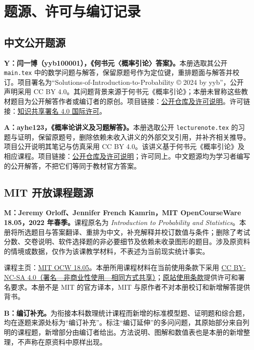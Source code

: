 \documentclass[UTF8,12pt,a4paper,fontset=fandol]{ctexart}
\begin{document}
\clearpage
\section*{题源、许可与编订记录}
\subsection*{中文公开题源}
\textbf{Y：闫一博（yyb100001），《何书元〈概率引论〉答案》。}本册选取其公开 \texttt{main.tex} 中的数学问题与解答，保留原题号作为定位键，重排题面与解答并校订。项目署名为“Solutions-of-Introduction-to-Probability © 2024 by yyb”，公开声明采用 CC BY 4.0。其问题背景来源于何书元《概率引论》；本册未冒称这些教材题目为公开解答作者或编订者的原创。项目链接：\href{https://github.com/yyb100001/Solutions-of-Introduction-to-Probability}{公开仓库及许可说明}。许可链接：\href{https://creativecommons.org/licenses/by/4.0/}{知识共享署名 4.0 国际许可}。

\textbf{A：ayhe123，《概率论讲义及习题解答》。}本册选取公开 \texttt{lecturenote.tex} 的习题与证明，保留原题号，删除依赖未收入讲义的外部交叉引用，并补齐相关推导。项目公开说明其笔记与仿真采用 CC BY 4.0。该讲义基于何书元《概率引论》及相应课程。项目链接：\href{https://github.com/ayhe123/probabilityTheory-lecturenote}{公开仓库及许可说明}；许可同上。中文题源均为学习者编写的公开解答，不把它们等同于教材官方答案。

\subsection*{MIT 开放课程题源}
\textbf{M：Jeremy Orloff、Jennifer French Kamrin，MIT OpenCourseWare 18.05，2022 年春季。}课程原名为 \textit{Introduction to Probability and Statistics}。本册将所选题目与答案翻译、重排为中文，补充解释并校订数值与条件；删除了考试分数、交卷说明、软件选择题的非必要细节及依赖未收录图形的题目。涉及原资料的情境或数据，仅作为该课教学材料，不表述为当前现实统计事实。

课程主页：\href{https://ocw.mit.edu/courses/18-05-introduction-to-probability-and-statistics-spring-2022/}{MIT OCW 18.05}。本册所用课程材料在当前使用条款下采用 \href{https://creativecommons.org/licenses/by-nc-sa/4.0/}{CC BY-NC-SA 4.0（署名—非商业性使用—相同方式共享）}；\href{https://ocw.mit.edu/pages/privacy-and-terms-of-use/}{原站使用条款}提供许可和署名要求。本册不是 MIT 的官方译本，MIT 与原作者不对本册校订和新增解答提供背书。

\textbf{B：编订补充。}为衔接本科数理统计课程而新增的标准模型题、证明题和综合题，均在逐题来源处标为“编订补充”。标注“编订延伸”的多问问题，其原始部分来自列明的课程题，新增部分由编订者给出。方法说明、图解和数值表也是本册的新增整理，不声称在原资料中原样出现。
\end{document}
